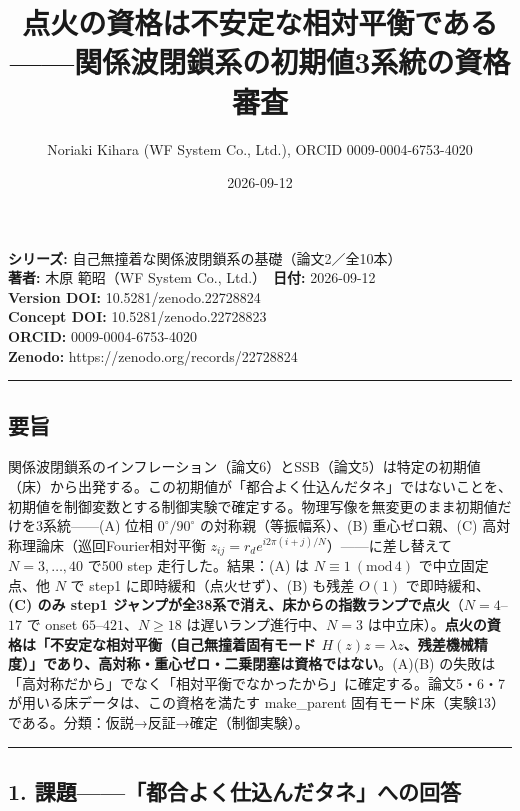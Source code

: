 \documentclass[
  a4paper,
]{ltjsarticle}
\title{点火の資格は不安定な相対平衡である------関係波閉鎖系の初期値3系統の資格審査}
\author{Noriaki Kihara (WF System Co., Ltd.), ORCID 0009-0004-6753-4020}
\date{2026-09-12}
\begin{document}
\maketitle

\textbf{シリーズ:} 自己無撞着な関係波閉鎖系の基礎（論文2／全10本）\\
\textbf{著者:} 木原 範昭（WF System Co., Ltd.）　\textbf{日付:}
2026-09-12\\
\textbf{Version DOI:} 10.5281/zenodo.22728824\\
\textbf{Concept DOI:} 10.5281/zenodo.22728823\\
\textbf{ORCID:} 0009-0004-6753-4020\\
\textbf{Zenodo:} https://zenodo.org/records/22728824\\

\begin{center}\rule{0.5\linewidth}{0.5pt}\end{center}

\subsection{要旨}\label{ux8981ux65e8}

関係波閉鎖系のインフレーション（論文6）とSSB（論文5）は特定の初期値（床）から出発する。この初期値が「都合よく仕込んだタネ」ではないことを、初期値を制御変数とする制御実験で確定する。物理写像を無変更のまま初期値だけを3系統------(A)
位相 \(0^\circ/90^\circ\) の対称親（等振幅系）、(B) 重心ゼロ親、(C)
高対称理論床（巡回Fourier相対平衡
\(z_{ij}=r_d e^{i2\pi(i+j)/N}\)）------に差し替えて \(N=3,\ldots,40\)
で500 step 走行した。結果：(A) は \(N\equiv1\ (\mathrm{mod}\,4)\)
で中立固定点、他 \(N\) で step1 に即時緩和（点火せず）、(B) も残差
\(O(1)\) で即時緩和、\textbf{(C) のみ step1
ジャンプが全38系で消え、床からの指数ランプで点火}（\(N=4\)--\(17\) で
onset \(65\)--\(421\)、\(N\ge18\) は遅いランプ進行中、\(N=3\)
は中立床）。\textbf{点火の資格は「不安定な相対平衡（自己無撞着固有モード
\(H(z)z=\lambda z\)、残差機械精度）」であり、高対称・重心ゼロ・二乗閉塞は資格ではない}。(A)(B)
の失敗は「高対称だから」でなく「相対平衡でなかったから」に確定する。論文5・6・7が用いる床データは、この資格を満たす
make\_parent
固有モード床（実験13）である。分類：仮説→反証→確定（制御実験）。

\begin{center}\rule{0.5\linewidth}{0.5pt}\end{center}

\subsection{1.
課題------「都合よく仕込んだタネ」への回答}\label{ux8ab2ux984cux90fdux5408ux3088ux304fux4ed5ux8fbcux3093ux3060ux30bfux30cdux3078ux306eux56deux7b54}
\end{document}
